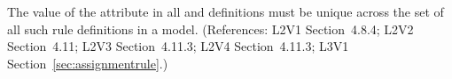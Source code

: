 The value of the  attribute in all \AssignmentRule and
\RateRule definitions must be unique across the set of all such rule
definitions in a model.  (References: L2V1 Section~4.8.4; 
L2V2 Section~4.11; L2V3 Section~4.11.3; L2V4 Section~4.11.3; L3V1 Section~\ref{sec:assignmentrule}.)
